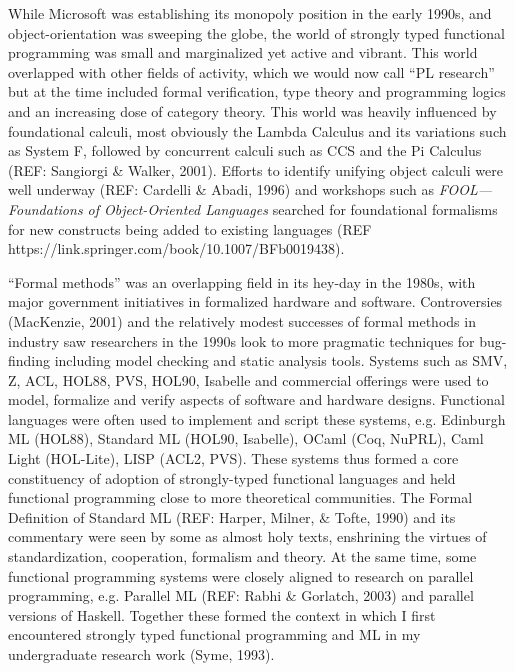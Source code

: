 \documentclass[acmsmall]{acmart}\settopmatter{}
\begin{document}
While Microsoft was establishing its monopoly position in the early 1990s, and object-orientation was sweeping the globe, the world of strongly
typed functional programming was small and marginalized yet active and vibrant.  This world overlapped with other fields of activity, which we
would now call “PL research” but at the time included formal verification, type theory and programming logics and an increasing dose of category
theory. This world was heavily influenced by foundational calculi, most obviously the Lambda Calculus and its variations such as System F, followed by
concurrent calculi such as CCS and the Pi Calculus (REF: Sangiorgi \& Walker, 2001).  Efforts to identify unifying object calculi were well
underway (REF: Cardelli \& Abadi, 1996) and workshops such as \textit{FOOL---Foundations of Object-Oriented Languages} searched
for foundational formalisms for new constructs being added to
existing languages (REF https://link.springer.com/book/10.1007/BFb0019438).

“Formal methods” was an overlapping field in its hey-day in the 1980s, with major government initiatives in formalized hardware and software.
Controversies (MacKenzie, 2001) and the relatively modest successes of formal methods in industry saw researchers in the 1990s look to more pragmatic
techniques for bug-finding including model checking and static analysis tools. Systems such as SMV, Z, ACL, HOL88, PVS, HOL90, Isabelle and commercial
offerings were used to model, formalize and verify aspects of software and hardware designs.   Functional languages were often used to implement and
script these systems, e.g. Edinburgh ML (HOL88), Standard ML (HOL90, Isabelle), OCaml (Coq, NuPRL), Caml Light (HOL-Lite), LISP (ACL2, PVS).  These systems
thus formed a core constituency of adoption of strongly-typed functional languages and held functional programming close to more theoretical
communities.  The Formal Definition of Standard ML (REF: Harper, Milner, \& Tofte, 1990) and its commentary were seen by some as almost holy texts, enshrining
the virtues of standardization, cooperation, formalism and theory. At the same time, some functional programming systems were closely aligned to research
on parallel programming, e.g. Parallel ML (REF: Rabhi \& Gorlatch, 2003) and parallel versions of Haskell.  Together these formed the context in which I first
encountered strongly typed functional programming and ML in my undergraduate research work (Syme, 1993).
\end{document}

